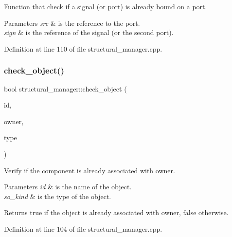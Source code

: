 Function that check if a signal (or port) is already bound on a port. 


\begin{DoxyParams}{Parameters}
{\em src} & is the reference to the port. \\
\hline
{\em sign} & is the reference of the signal (or the second port). \\
\hline
\end{DoxyParams}


Definition at line 110 of file structural\+\_\+manager.\+cpp.

\mbox{\label{classstructural__manager_a9fbb1019c9ffe7b78303ce0d85200ad6}} 
\subsubsection{\texorpdfstring{check\+\_\+object()}{check\_object()}}
{\footnotesize\ttfamily bool structural\+\_\+manager\+::check\+\_\+object (\begin{DoxyParamCaption}\item[{std\+::string}]{id,  }\item[{\hyperlink{structural__objects_8hpp_a8ea5f8cc50ab8f4c31e2751074ff60b2}{structural\+\_\+object\+Ref}}]{owner,  }\item[{\hyperlink{structural__objects_8hpp_acf52399aecacb7952e414c5746ce6439}{so\+\_\+kind}}]{type }\end{DoxyParamCaption})}



Verify if the component is already associated with owner. 


\begin{DoxyParams}{Parameters}
{\em id} & is the name of the object. \\
\hline
{\em so\+\_\+kind} & is the type of the object. \\
\hline
\end{DoxyParams}
\begin{DoxyReturn}{Returns}
true if the object is already associated with owner, false otherwise. 
\end{DoxyReturn}


Definition at line 104 of file structural\+\_\+manager.\+cpp.



